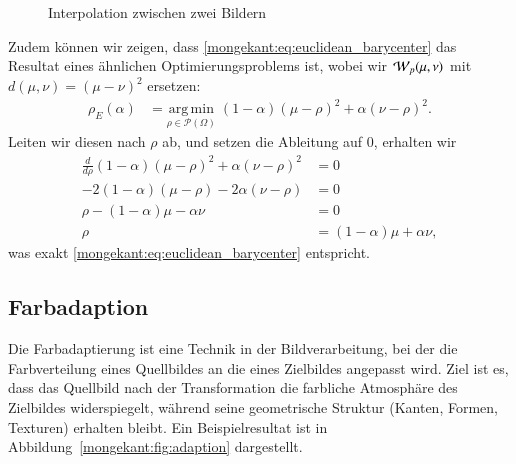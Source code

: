\begin{figure}
\centering
{}
\caption{Interpolation zwischen zwei Bildern}
\label{mongekant:fig:barycenter2d}
\end{figure}


Zudem können wir zeigen,
dass \eqref{mongekant:eq:euclidean_barycenter} das Resultat eines ähnlichen Optimierungsproblems ist,
wobei wir $\wasserstein(\mu, \nu)$ mit $d(\mu, \nu) = (\mu - \nu)^2$ ersetzen:
\begin{align*}
\rho_E(\alpha)
&=
\underset{\rho \in \mathcal{P}(\Omega)}{\mathrm{arg\,min}}\;
(1-\alpha) (\mu - \rho)^2
+ \alpha (\nu - \rho)^2
.
\end{align*}
Leiten wir diesen nach $\rho$ ab,
und setzen die Ableitung auf $0$,
erhalten wir
\begin{align*}
\frac{d}{d\rho}
(1- \alpha) (\mu - \rho)^2 + \alpha (\nu - \rho)^2
&=
0
\\
-2(1-\alpha)(\mu - \rho) - 2\alpha(\nu - \rho)
&=
0
\\
\rho - (1-\alpha)\mu - \alpha \nu
&=
0
\\
\rho
&=
(1-\alpha)\mu + \alpha \nu
,
\end{align*}
was exakt \eqref{mongekant:eq:euclidean_barycenter} entspricht.

\subsection{Farbadaption\label{mongekant:subsection:farbadaption}}

Die Farbadaptierung ist eine Technik in der Bildverarbeitung,
bei der die Farbverteilung eines Quellbildes an die eines Zielbildes angepasst wird.
Ziel ist es,
dass das Quellbild nach der Transformation
die farbliche Atmosphäre des Zielbildes widerspiegelt,
während seine geometrische Struktur (Kanten, Formen, Texturen) erhalten bleibt.
Ein Beispielresultat ist in Abbildung~\ref{mongekant:fig:adaption} dargestellt.

